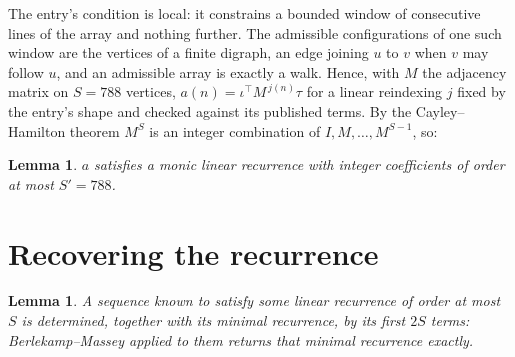 \documentclass[11pt,a4paper]{article}
\theoremstyle{plain}
\newtheorem{lemma}[theorem]{Lemma}
\theoremstyle{definition}
\begin{document}
The entry's condition is local: it constrains a bounded window of consecutive lines of the
array and nothing further. The admissible configurations of one such window are the vertices
of a finite digraph, an edge joining $u$ to $v$ when $v$ may follow $u$, and an admissible
array is exactly a walk. Hence, with $M$ the adjacency matrix on $S=788$ vertices,
$a(n)=\iota^{\!\top}M^{\,j(n)}\tau$ for a linear reindexing $j$ fixed by the entry's shape
and checked against its published terms. By the Cayley--Hamilton theorem $M^{S}$ is an
integer combination of $I,M,\dots,M^{S-1}$, so:

\begin{lemma}\label{lem:cf}
$a$ satisfies a monic linear recurrence with integer coefficients of order at most
$S'=788$.
\end{lemma}

\section{Recovering the recurrence}

\begin{lemma}\label{lem:bm}
A sequence known to satisfy some linear recurrence of order at most $S$ is determined, together
with its minimal recurrence, by its first $2S$ terms: Berlekamp--Massey applied to them returns
that minimal recurrence exactly.
\end{lemma}
\end{document}
